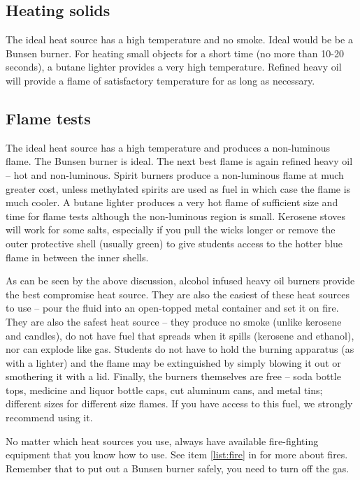 \subsection{Heating solids}
The ideal heat source has a high temperature and no smoke. 
Ideal would be be a Bunsen burner. 
For heating small objects for a short time (no more than 10-20 seconds), 
a butane lighter provides a very high temperature. 
Refined heavy oil will provide a flame of satisfactory temperature 
for as long as necessary.

\subsection{Flame tests}
The ideal heat source has a high temperature 
and produces a non-luminous flame. 
The Bunsen burner is ideal. 
The next best flame is again refined heavy oil – hot and non-luminous. 
Spirit burners produce a non-luminous flame at much greater cost, 
unless methylated spirits are used as fuel 
in which case the flame is much cooler. 
A butane lighter produces a very hot flame of sufficient size 
and time for flame tests although the non-luminous region is small. 
Kerosene stoves will work for some salts, 
especially if you pull the wicks longer 
or remove the outer protective shell (usually green) 
to give students access to the hotter blue flame in between the inner shells.

As can be seen by the above discussion, 
alcohol infused heavy oil burners provide the best compromise heat source. 
They are also the easiest of these heat sources to use -- 
pour the fluid into an open-topped metal container and set it on fire. 
They are also the safest heat source -- 
they produce no smoke (unlike kerosene and candles), 
do not have fuel that spreads when it spills (kerosene and ethanol), 
nor can explode like gas. 
Students do not have to hold the burning apparatus (as with a lighter) 
and the flame may be extinguished by simply blowing it out 
or smothering it with a lid. 
Finally, 
the burners themselves are free -- soda bottle tops, 
medicine and liquor bottle caps, 
cut aluminum cans, 
and metal tins; different sizes for different size flames. 
If you have access to this fuel, 
we strongly recommend using it.

No matter which heat sources you use, 
always have available fire-fighting equipment that you know how to use. 
See item \ref{list:fire} in  for more about fires. 
Remember that to put out a Bunsen burner safely, 
you need to turn off the gas.

